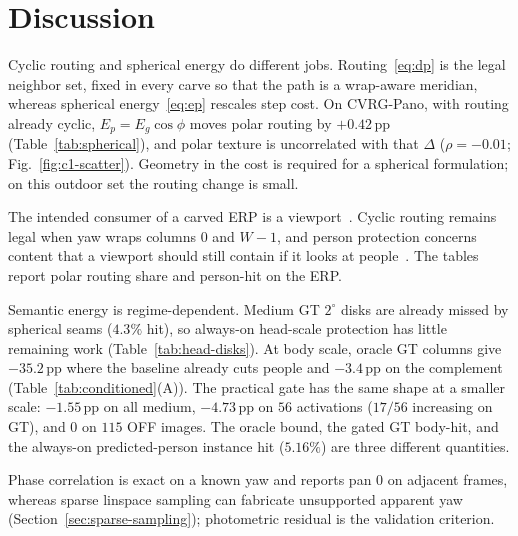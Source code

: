 \section{Discussion}
\label{sec:discussion}

Cyclic routing and spherical energy do different jobs.
Routing~\eqref{eq:dp} is the legal neighbor set, fixed in every
carve so that the path is a wrap-aware meridian, whereas
spherical energy~\eqref{eq:ep} rescales step cost. On CVRG-Pano,
with routing already cyclic, $E_p=E_g\cos\phi$ moves polar
routing by $+0.42$\,pp (Table~\ref{tab:spherical}), and polar
texture is uncorrelated with that $\Delta$ ($\rho=-0.01$;
Fig.~\ref{fig:c1-scatter}). Geometry in the cost is required for
a spherical formulation; on this outdoor set the routing change
is small.

The intended consumer of a carved ERP is a
viewport~\cite{corbillon2017viewport,qian2018flare}. Cyclic
routing remains legal when yaw wraps columns $0$ and $W-1$, and
person protection concerns content that a viewport should still
contain if it looks at
people~\cite{sitzmann2018saliencyvr,david2018headeye}. The tables
report polar routing share and person-hit on the ERP.

Semantic energy is regime-dependent. Medium GT $2^\circ$ disks
are already missed by spherical seams ($4.3\%$ hit), so
always-on head-scale protection has little remaining work
(Table~\ref{tab:head-disks}). At body scale, oracle GT columns
give $-35.2$\,pp where the baseline already cuts people and
$-3.4$\,pp on the complement (Table~\ref{tab:conditioned}(A)).
The practical gate has the same shape at a smaller scale:
$-1.55$\,pp on all medium, $-4.73$\,pp on $56$ activations
($17/56$ increasing on GT), and $0$ on $115$ OFF images. The
oracle bound, the gated GT body-hit, and the always-on
predicted-person instance hit ($5.16\%$) are three different
quantities.

Phase correlation is exact on a known yaw and reports pan $0$ on
adjacent frames, whereas sparse linspace sampling can fabricate
unsupported apparent yaw (Section~\ref{sec:sparse-sampling});
photometric residual is the validation criterion.
